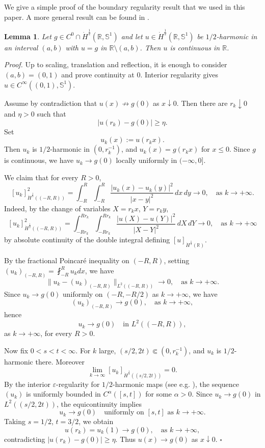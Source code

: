 \documentclass[12pt, a4paper]{article}
\newtheorem{lem}[thm]{Lemma}
\newenvironment{proof}{\noindent\emph{Proof.}}{\hfill$\square$\medskip}
\newcommand{\sph}{\mathbb{S}}
\newcommand{\R}{\mathbb{R}}
\renewcommand{\(}{\left(}
\renewcommand{\)}{\right)}
\begin{document}
We give a simple proof of the boundary regularity result that we used in this paper. A more general result can be found in \cite{Sch}.

\begin{lem}\label{bdryreg} Let $g\in C^0\cap\dot H^\frac12(\R,\sph^1)$ and let $u\in \dot H^{\frac12}(\R,\sph^1)$ be $1/2$-harmonic in an interval $(a,b)$ with $u=g$ in $\R\setminus (a,b)$. Then $u$ is continuous in $\R$.
\end{lem}


\begin{proof}
Up to scaling, translation and reflection, it is enough to consider $(a,b)=(0,1)$ and prove continuity at $0$.
Interior regularity gives $u\in C^\infty((0,1),\sph^1)$.

Assume by contradiction that $u(x)\not\to g(0)$ as $x\downarrow0$. Then there are
$r_k\downarrow0$ and $\eta>0$ such that
\[
|u(r_k)-g(0)|\ge \eta .
\]
Set
\[
u_k(x):=u(r_kx).
\]
Then $u_k$ is $1/2$-harmonic in $(0,r_k^{-1})$, and $u_k(x)=g(r_kx)$
for $x\le0$. Since $g$ is continuous, we have
$u_k\to g(0)$ locally uniformly in $(-\infty,0]$.

We claim that for every $R>0$,
\[
[u_k]^2_{\dot H^{\frac12}((-R,R))}
=
\int_{-R}^{R}\int_{-R}^{R}
\frac{|u_k(x)-u_k(y)|^2}{|x-y|^2}\,dx\,dy
\to0,\quad \text{as }k\to+\infty.
\]
Indeed, by the change of variables $X=r_kx$, $Y=r_ky$,
\[
[u_k]^2_{\dot H^{\frac12}((-R,R))}
=
\int_{-Rr_k}^{Rr_k}\int_{-Rr_k}^{Rr_k}
\frac{|u(X)-u(Y)|^2}{|X-Y|^2}\,dX\,dY\to 0,\quad \text{as }k\to+\infty
\]
by absolute continuity of the double integral defining
$[u]_{\dot H^{\frac12}(\mathbb R)}$.

By the fractional Poincar\'e inequality on $(-R,R)$, setting $(u_k)_{(-R,R)}=\fint_{-R}^R u_k dx$, we have
\[
\|u_k-(u_k)_{(-R,R)}\|_{L^2((-R,R))}\to 0, \quad \text{as }k\to+\infty.
\]
Since $u_k\to g(0)$ uniformly on $(-R,-R/2)$ as $k\to +\infty$, we have
\[
(u_k)_{(-R,R)}\to g(0), \quad \text{as }k\to+\infty,
\]
hence
\[
u_k\to g(0)
\quad\text{in }L^2((-R,R)),
\]
as $k\to+\infty$, for every $R>0$.

Now fix $0<s<t<\infty$. For $k$ large, $(s/2,2t)\Subset (0,r_k^{-1})$, and $u_k$
is $1/2$-harmonic there. Moreover
\[
\lim_{k\to\infty}[u_k]_{\dot H^{\frac12}((s/2,2t))}=0.
\]
By the interior $\varepsilon$-regularity for $1/2$-harmonic maps (see e.g. \cite[Theorem 1.1]{Sch2}), %
the sequence $(u_k)$ is uniformly bounded in $C^\alpha([s,t])$
for some $\alpha>0$. Since $u_k\to g(0)$ in $L^2((s/2,2t))$, the equicontinuity implies
\[
u_k\to g(0)
\quad\text{uniformly on }[s,t]\text{ as }k\to+\infty.
\]
Taking $s=1/2$, $t=3/2$, we obtain
\[
u(r_k)=u_k(1)\to g(0),\quad  \text{as }k\to+\infty,
\]
contradicting $|u(r_k)-g(0)|\ge\eta$. Thus $u(x)\to g(0)$ as $x\downarrow0$.
\end{proof}
\end{document}
